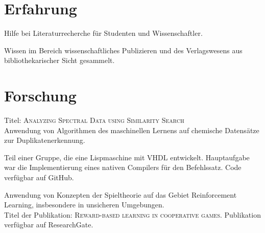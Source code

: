 \documentclass[]{deedy-resume-openfont}
\begin{document}
\begin{minipage}[t]{0.66\textwidth}


\section{Erfahrung}

\vspace{\topsep} %
\begin{tightemize}
\item Hilfe bei Literaturrecherche für Studenten und Wissenschaftler.
\item Wissen im Bereich wissenschaftliches Publizieren und des Verlagswesens aus bibliothekarischer Sicht gesammelt.
\end{tightemize}
\sectionsep


\section{Forschung}
\descript{}
Titel: \textsc{Analyzing Spectral Data using Similarity Search} \\
Anwendung von Algorithmen des maschinellen Lernens auf chemische Datensätze zur Duplikatenerkennung.
\sectionsep

Teil einer Gruppe, die eine Lispmaschine mit VHDL entwickelt. Hauptaufgabe war die Implementierung eines nativen Compilers für den Befehlssatz. Code verfügbar auf GitHub.

\descript{}
Anwendung von Konzepten der Spieltheorie auf das Gebiet Reinforcement Learning, insbesondere in unsicheren Umgebungen. \\
Titel der Publikation: \textsc{Reward-based learning in cooperative games}. Publikation verfügbar auf ResearchGate.
\sectionsep


\end{minipage}
\end{document}
